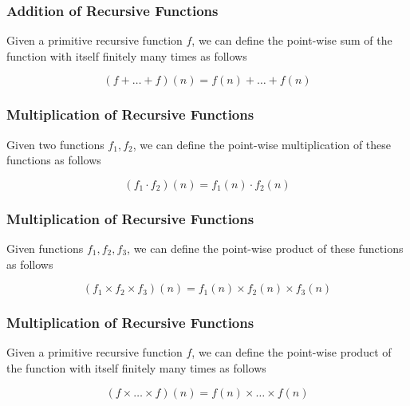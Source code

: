 \documentclass{beamer}
\theoremstyle{indentDefn} \newtheorem{defn}[]{Definition}
\begin{document}
\begin{frame}
	\frametitle{Addition of Recursive Functions}

	Given a primitive recursive function $f$, we can define the point-wise sum of the function with itself finitely many times as follows 

	$$(f + \dots + f)(n) = f(n) + \dots + f(n)$$
	
	

	\vspace{6cm}

\end{frame}

\begin{frame}
	\frametitle{Multiplication of Recursive Functions}

	Given two functions $f_{1},f_{2}$, we can define the point-wise multiplication of these functions as follows 

	$$(f_{1} \cdot f_{2})(n) = f_{1}(n) \cdot f_{2}(n)$$
	

	\vspace{6cm}

\end{frame}

\begin{frame}
	\frametitle{Multiplication of Recursive Functions}

	Given functions $f_{1},f_{2},f_{3}$, we can define the point-wise product of these functions as follows 

	$$(f_{1} \times f_{2} \times f_{3})(n) = f_{1}(n) \times f_{2}(n) \times f_{3}(n)$$
	

	\vspace{6cm}

\end{frame}


\begin{frame}
	\frametitle{Multiplication of Recursive Functions}

	Given a primitive recursive function $f$, we can define the point-wise product of the function with itself finitely many times as follows 

	$$(f \times \dots \times f)(n) = f(n) \times \dots \times f(n)$$
	


	\vspace{6cm}

\end{frame}
\end{document}
